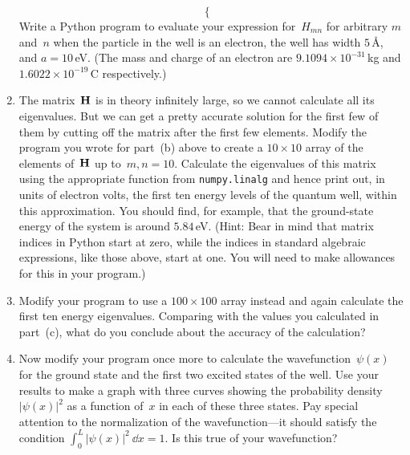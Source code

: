 \documentclass[12pt]{article}
\begin{document}
\begin{exercises}
\begin{enumerate}
\begin{displaymath}
\begin{cases}
    \end{cases}
\end{displaymath}
Write a Python program to evaluate your expression for~$H_{mn}$ for
arbitrary $m$ and~$n$ when the particle in the well is an electron, the
well has width $5\,$\AA, and $a=10\,$eV.  (The mass and charge of an
electron are $9.1094\times10^{-31}\,$kg and $1.6022\times10^{-19}\,$C
respectively.)
\item The matrix~$\mathbf{H}$ is in theory infinitely large, so we cannot
  calculate all its eigenvalues.  But we can get a pretty accurate solution
  for the first few of them by cutting off the matrix after the first few
  elements.  Modify the program you wrote for part~(b) above to create a
  $10\times10$ array of the elements of~$\mathbf{H}$ up to~$m,n=10$.
  Calculate the eigenvalues of this matrix using the appropriate function
  from \verb|numpy.linalg| and hence print out, in units of electron volts,
  the first ten energy levels of the quantum well, within this
  approximation.  You should find, for example, that the ground-state
  energy of the system is around $5.84\,$eV.  (Hint: Bear in mind that
  matrix indices in Python start at zero, while the indices in standard
  algebraic expressions, like those above, start at one.  You will need to
  make allowances for this in your program.)
\item Modify your program to use a $100\times100$ array instead and again
  calculate the first ten energy eigenvalues.  Comparing with the values
  you calculated in part~(c), what do you conclude about the accuracy of
  the calculation?
\item Now modify your program once more to calculate the
  wavefunction~$\psi(x)$ for the ground state and the first two excited
  states of the well.  Use your results to make a graph with three curves
  showing the probability density~$|\psi(x)|^2$ as a function of~$x$ in
  each of these three states.  Pay special attention to the normalization
  of the wavefunction---it should satisfy the condition $\int_0^L
  |\psi(x)|^2 \>\dd x=1$.  Is this true of your wavefunction?
\end{enumerate}




\end{exercises}
\end{document}
